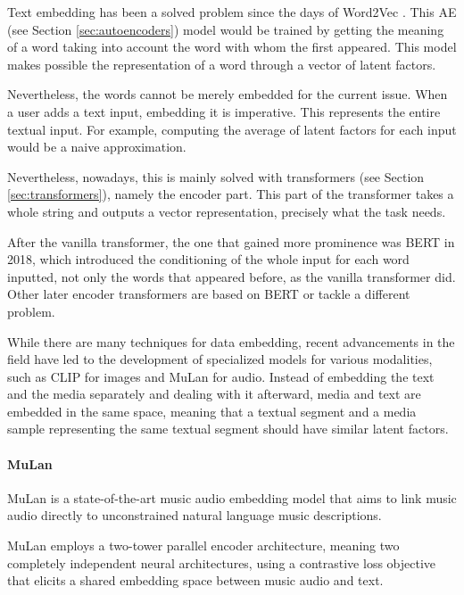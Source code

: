 Text embedding has been a solved problem since the days of Word2Vec \cite{mikolov_efficient_2013}. This \ac{AE} (see Section \ref{sec:autoencoders}) model would be trained by getting the meaning of a word taking into account the word with whom the first appeared. This model makes possible the representation of a word through a vector of latent factors.

Nevertheless, the words cannot be merely embedded for the current issue. When a user adds a text input, embedding it is imperative. This represents the entire textual input. For example, computing the average of latent factors for each input would be a naive approximation.

Nevertheless, nowadays, this is mainly solved with transformers (see Section \ref{sec:transformers}), namely the encoder part. This part of the transformer takes a whole string and outputs a vector representation, precisely what the task needs.

After the vanilla transformer, the one that gained more prominence was BERT \cite{devlin_bert_2018} in 2018, which introduced the conditioning of the whole input for each word inputted, not only the words that appeared before, as the vanilla transformer did. Other later encoder transformers are based on BERT or tackle a different problem.

While there are many techniques for data embedding, recent advancements in the field have led to the development of specialized models for various modalities, such as CLIP \cite{radford_learning_2021} for images and MuLan for audio. Instead of embedding the text and the media separately and dealing with it afterward, media and text are embedded in the same space, meaning that a textual segment and a media sample representing the same textual segment should have similar latent factors.

\paragraph{MuLan} \label{sec:mulan}

MuLan \cite{huang_mulan_2022} is a state-of-the-art music audio embedding model that aims to link music audio directly to unconstrained natural language music descriptions.

MuLan employs a two-tower parallel encoder architecture, meaning two completely independent neural architectures, using a contrastive loss objective that elicits a shared embedding space between music audio and text.

